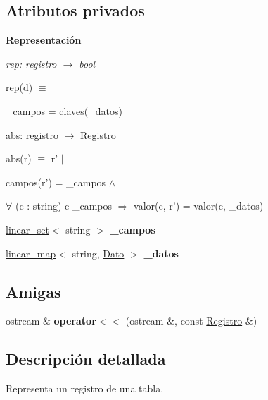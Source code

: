 \subsection*{Atributos privados}
\begin{Indent}{\bf Representación}\par
{\em rep\-: registro $\to$ bool\par
rep(d) $\equiv$
\begin{DoxyItemize}
\item \-\_\-campos = claves(\-\_\-datos)
\end{DoxyItemize}

abs\-: registro $\to$ \hyperlink{classRegistro}{Registro}\par
abs(r) $\equiv$ r' $|$
\begin{DoxyItemize}
\item campos(r') = \-\_\-campos $\land$
\item $\forall$ (c \-: string) c  \-\_\-campos $\Rightarrow$ valor(c, r') = valor(c, \-\_\-datos) 
\end{DoxyItemize}}\begin{DoxyCompactItemize}
\item 
\hypertarget{classRegistro_ad6c12d81cb20086a4642f4b85fe8063b}{\hyperlink{classlinear__set}{linear\-\_\-set}$<$ string $>$ {\bfseries \-\_\-campos}}\label{classRegistro_ad6c12d81cb20086a4642f4b85fe8063b}

\item 
\hypertarget{classRegistro_a87c21ec5101090321cef177f3a256132}{\hyperlink{classlinear__map}{linear\-\_\-map}$<$ string, \hyperlink{classDato}{Dato} $>$ {\bfseries \-\_\-datos}}\label{classRegistro_a87c21ec5101090321cef177f3a256132}

\end{DoxyCompactItemize}
\end{Indent}
\subsection*{Amigas}
\begin{DoxyCompactItemize}
\item 
\hypertarget{classRegistro_a66788288d92ef16b5a3aab86ae6d87fc}{ostream \& {\bfseries operator$<$$<$} (ostream \&, const \hyperlink{classRegistro}{Registro} \&)}\label{classRegistro_a66788288d92ef16b5a3aab86ae6d87fc}

\end{DoxyCompactItemize}


\subsection{Descripción detallada}
Representa un registro de una tabla. 

